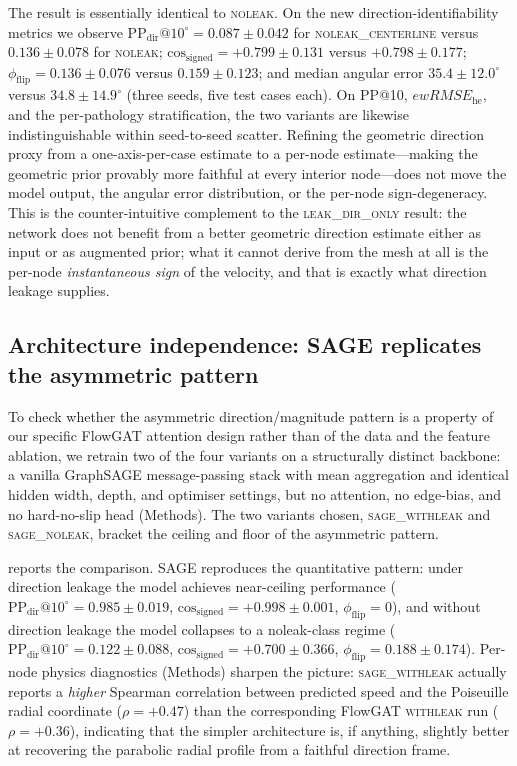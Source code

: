 \documentclass[10pt,a4paper]{article}
\makeatletter
\newcommand{\withleak}{\textsc{withleak}}
\newcommand{\dironly}{\textsc{leak\_dir\_only}}
\newcommand{\noleak}{\textsc{noleak}}
\newcommand{\centerlinenoleak}{\textsc{noleak\_centerline}}
\newcommand{\sagewithleak}{\textsc{sage\_withleak}}
\newcommand{\sagenoleak}{\textsc{sage\_noleak}}
\newcommand{\PPdir}[1]{\mathrm{PP_{dir}}@#1^\circ}
\newcommand{\cosgn}{\mathrm{cos}_\mathrm{signed}}
\newcommand{\fracflip}{\phi_\mathrm{flip}}
\newcommand{\ewRMSE}{ewRMSE_{\text{he}}}
\makeatother
\begin{document}
The result is essentially identical to \noleak{}. On the new
direction-identifiability metrics we observe
$\PPdir{10} = 0.087 \pm 0.042$ for \centerlinenoleak{} versus
$0.136 \pm 0.078$ for \noleak{};
$\cosgn = +0.799 \pm 0.131$ versus $+0.798 \pm 0.177$;
$\fracflip = 0.136 \pm 0.076$ versus $0.159 \pm 0.123$;
and median angular error $35.4 \pm 12.0^\circ$ versus
$34.8 \pm 14.9^\circ$ (three seeds, five test cases each). On
PP@10, $\ewRMSE$, and the per-pathology stratification, the two
variants are likewise indistinguishable within seed-to-seed scatter.
Refining the geometric direction proxy from a one-axis-per-case
estimate to a per-node estimate---making the geometric prior
provably more faithful at every interior node---does not move the
model output, the angular error distribution, or the per-node
sign-degeneracy. This is the counter-intuitive complement to the
\dironly{} result: the network does not benefit from a better
geometric direction estimate either as input or as augmented prior;
what it cannot derive from the mesh at all is the per-node
\emph{instantaneous sign} of the velocity, and that is exactly what
direction leakage supplies.

\subsection*{Architecture independence: SAGE replicates the asymmetric pattern}
\label{sec:sage}

To check whether the asymmetric direction/magnitude pattern is a
property of our specific FlowGAT attention design rather than of the
data and the feature ablation, we retrain two of the four variants on
a structurally distinct backbone: a vanilla GraphSAGE message-passing
stack with mean aggregation and identical hidden width, depth, and
optimiser settings, but no attention, no edge-bias, and no
hard-no-slip head (Methods). The two variants chosen, \sagewithleak{}
and \sagenoleak{}, bracket the ceiling and floor of the asymmetric
pattern.

 reports the comparison. SAGE reproduces the
quantitative pattern: under direction leakage the model achieves
near-ceiling performance ($\PPdir{10} = 0.985 \pm 0.019$,
$\cosgn = +0.998 \pm 0.001$, $\fracflip = 0$), and without direction
leakage the model collapses to a noleak-class regime
($\PPdir{10} = 0.122 \pm 0.088$, $\cosgn = +0.700 \pm 0.366$,
$\fracflip = 0.188 \pm 0.174$). Per-node physics diagnostics
(Methods) sharpen the picture: \sagewithleak{} actually reports a
\emph{higher} Spearman correlation between predicted speed and the
Poiseuille radial coordinate ($\rho = +0.47$) than the
corresponding FlowGAT \withleak{} run ($\rho = +0.36$), indicating
that the simpler architecture is, if anything, slightly better at
recovering the parabolic radial profile from a faithful direction
frame.
\end{document}
